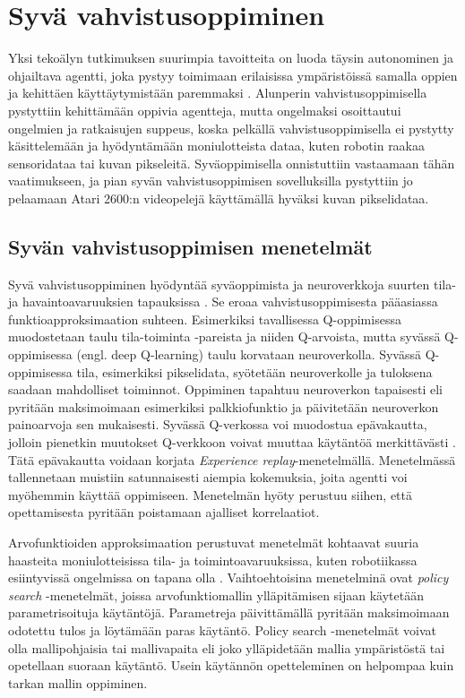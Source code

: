 \documentclass[utf8]{gradu3}
\begin{document}
\section{Syvä vahvistusoppiminen}

Yksi tekoälyn tutkimuksen suurimpia tavoitteita on luoda täysin autonominen ja ohjailtava agentti, joka pystyy toimimaan erilaisissa ympäristöissä samalla oppien ja kehittäen käyttäytymistään paremmaksi \parencite{arulkumaran2017brief}. Alunperin vahvistusoppimisella pystyttiin kehittämään oppivia agentteja, mutta ongelmaksi osoittautui ongelmien ja ratkaisujen suppeus, koska pelkällä vahvistusoppimisella ei pystytty käsittelemään ja hyödyntämään moniulotteista dataa, kuten robotin raakaa sensoridataa tai kuvan pikseleitä. Syväoppimisella onnistuttiin vastaamaan tähän vaatimukseen, ja pian syvän vahvistusoppimisen sovelluksilla pystyttiin jo pelaamaan Atari 2600:n videopelejä käyttämällä hyväksi kuvan pikselidataa.

\subsection{Syvän vahvistusoppimisen menetelmät}

Syvä vahvistusoppiminen hyödyntää syväoppimista ja neuroverkkoja suurten tila- ja havaintoavaruuksien tapauksissa \parencite{arulkumaran2017brief,li2018deep}. Se eroaa vahvistusoppimisesta pääasiassa funktioapproksimaation suhteen. Esimerkiksi tavallisessa Q-oppimisessa muodostetaan taulu tila-toiminta -pareista ja niiden Q-arvoista, mutta syvässä Q-oppimisessa (engl. deep Q-learning) taulu korvataan neuroverkolla. Syvässä Q-oppimisessa tila, esimerkiksi pikselidata, syötetään neuroverkolle ja tuloksena saadaan mahdolliset toiminnot. Oppiminen tapahtuu neuroverkon tapaisesti eli pyritään maksimoimaan esimerkiksi palkkiofunktio ja päivitetään neuroverkon painoarvoja sen mukaisesti. Syvässä Q-verkossa voi muodostua epävakautta, jolloin pienetkin muutokset Q-verkkoon voivat muuttaa käytäntöä merkittävästi \parencite{mnih2015human}. Tätä epävakautta voidaan korjata \textit{Experience replay}-menetelmällä. Menetelmässä tallennetaan muistiin satunnaisesti aiempia kokemuksia, joita agentti voi myöhemmin käyttää oppimiseen. Menetelmän hyöty perustuu siihen, että opettamisesta pyritään poistamaan ajalliset korrelaatiot.

Arvofunktioiden approksimaation perustuvat menetelmät kohtaavat suuria haasteita moniulotteisissa tila- ja toimintoavaruuksissa, kuten robotiikassa esiintyvissä ongelmissa on tapana olla \parencite{arulkumaran2017brief,deisenroth2013survey}. Vaihtoehtoisina menetelminä ovat \textit{policy search} -menetelmät, joissa arvofunktiomallin ylläpitämisen sijaan käytetään parametrisoituja käytäntöjä. Parametreja päivittämällä pyritään maksimoimaan odotettu tulos ja löytämään paras käytäntö. Policy search -menetelmät voivat olla mallipohjaisia tai mallivapaita eli joko ylläpidetään mallia ympäristöstä tai opetellaan suoraan käytäntö. Usein käytännön opetteleminen on helpompaa kuin tarkan mallin oppiminen.
\end{document}
